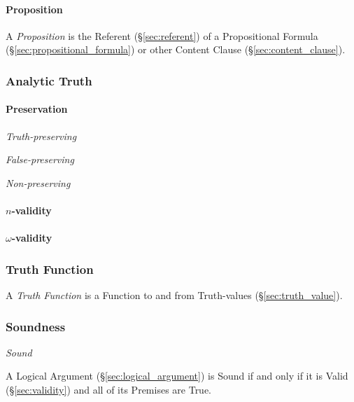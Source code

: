 \paragraph{Proposition}\label{sec:proposition}\hfill

A \emph{Proposition} is the Referent (\S\ref{sec:referent}) of a
Propositional Formula (\S\ref{sec:propositional_formula}) or other
Content Clause (\S\ref{sec:content_clause}).



\subsubsection{Analytic Truth}\label{sec:analytic_truth}

\paragraph{Preservation}\label{sec:preservation}\hfill

\emph{Truth-preserving}

\emph{False-preserving}

\emph{Non-preserving}



\paragraph{$n$-validity}\label{sec:n_validity}\hfill

\paragraph{$\omega$-validity}\label{sec:omega_validity}\hfill



\subsubsection{Truth Function}\label{sec:truth_function}

A \emph{Truth Function} is a Function to and from Truth-values
(\S\ref{sec:truth_value}).



\subsubsection{Soundness}\label{sec:soundness}

\emph{Sound}

A Logical Argument (\S\ref{sec:logical_argument}) is Sound if and only
if it is Valid (\S\ref{sec:validity}) and all of its Premises are
True.


